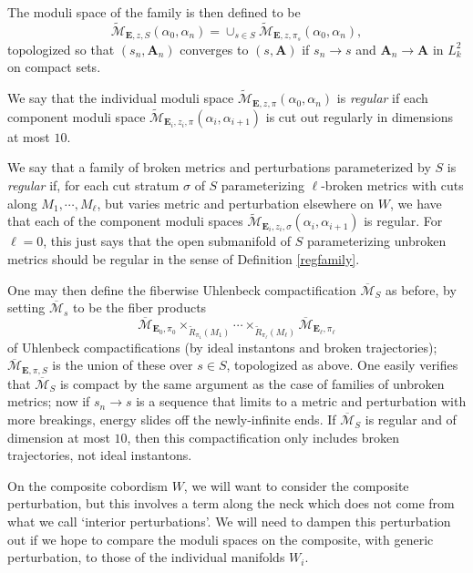 \documentclass{memo-l}
\theoremstyle{definition}
\theoremstyle{remark}
\numberwithin{section}{chapter}
\numberwithin{equation}{chapter}
\begin{document}
The moduli space of the family is then defined to be $$\widetilde{\mathcal M}_{\mathbf{E},z,S}(\alpha_0, \alpha_n) = \cup_{s \in S} \widetilde{\mathcal M}_{\mathbf{E},z,\pi_s}(\alpha_0, \alpha_n),$$ topologized so that $(s_n, \mathbf{A}_n)$ converges to $(s,\mathbf{A})$ if $s_n \to s$ and $\mathbf{A}_n \to \mathbf{A}$ in $L^2_k$ on compact sets.

We say that the individual moduli space $\widetilde{\mathcal M}_{\mathbf{E},z,\pi}(\alpha_0, \alpha_n)$ is \emph{regular} if each component moduli space $\widetilde{\mathcal M}_{\mathbf{E}_i,z_i,\pi}(\alpha_i, \alpha_{i+1})$ is cut out regularly in dimensions at most $10$.

We say that a family of broken metrics and perturbations parameterized by $S$ is \emph{regular} if, for each cut stratum $\sigma$ of $S$ parameterizing $\ell$-broken metrics with cuts along $M_1, \cdots, M_\ell$, but varies metric and perturbation elsewhere on $W$, we have that each of the component moduli spaces $\widetilde{\mathcal M}_{\mathbf{E}_i,z_i,\sigma}(\alpha_i, \alpha_{i+1})$ is regular. For $\ell = 0$, this just says that the open submanifold of $S$ parameterizing unbroken metrics should be regular in the sense of Definition \ref{regfamily}.

One may then define the fiberwise Uhlenbeck compactification $\overline{\mathcal M}_S$ as before, by setting $\overline{\mathcal M}_s$ to be the fiber products $$\overline{\mathcal M}_{\mathbf{E}_0,\pi_0} \times_{\widetilde R_{\pi_1}(M_1)} \cdots \times_{\widetilde R_{\pi_\ell}(M_\ell)} \overline{\mathcal M}_{\mathbf{E}_\ell,\pi_\ell}$$ of Uhlenbeck compactifications (by ideal instantons and broken trajectories); $\overline{\mathcal M}_{\mathbf{E},\pi,S}$ is the union of these over $s \in S$, topologized as above. One easily verifies that $\overline{\mathcal M}_S$ is compact by the same argument as the case of families of unbroken metrics; now if $s_n \to s$ is a sequence that limits to a metric and perturbation with more breakings, energy slides off the newly-infinite ends. If $\overline{\mathcal M}_S$ is regular and of dimension at most $10$, then this compactification only includes broken trajectories, not ideal instantons.

On the composite cobordism $W$, we will want to consider the composite perturbation, but this involves a term along the neck which does not come from what we call `interior perturbations'. We will need to dampen this perturbation out if we hope to compare the moduli spaces on the composite, with generic perturbation, to those of the individual manifolds $W_i$.
\end{document}
